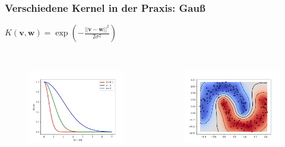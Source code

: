 	\begin{frame}
		\frametitle{Verschiedene Kernel in der Praxis: Gauß}
			\vspace{10pt}
			$K(\boldsymbol{v}, \boldsymbol{w}) = \exp(-\frac{\lvert\lvert\boldsymbol{v} - \boldsymbol{w}\rvert\rvert^{2}}{2\sigma^{2}})$ \\\
			
			\begin{columns}
				\begin{column}{.5\textwidth}
					\begin{figure}
						\includegraphics[width=\textwidth]{img/sigmaGau.png}
					\end{figure}
				\end{column}
				\begin{column}{.5\textwidth}
					\begin{figure}
						\includegraphics[width=\textwidth]{img/kernelGau.png}
					\end{figure}
				\end{column}
			\end{columns}
	\end{frame}
	

